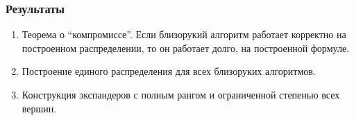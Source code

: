 \begin{frame}
    \frametitle{Результаты}

    \pause
    \begin{enumerate}
	    \item Теорема о ``компромиссе''. Если близорукий алгоритм работает
		    корректно на построенном распределении, то он работает долго, на
		    построенной формуле.
        \pause
        \item Построение единого распределения для всех близоруких алгоритмов.
        \pause
        \item Конструкция экспандеров с полным рангом и ограниченной
		    степенью всех вершин.
    \end{enumerate}
\end{frame}